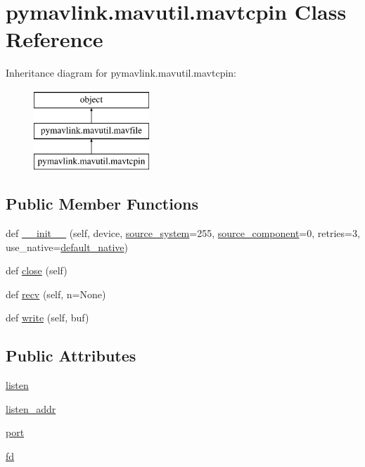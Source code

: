 \hypertarget{classpymavlink_1_1mavutil_1_1mavtcpin}{}\section{pymavlink.\+mavutil.\+mavtcpin Class Reference}
\label{classpymavlink_1_1mavutil_1_1mavtcpin}
Inheritance diagram for pymavlink.\+mavutil.\+mavtcpin\+:\begin{figure}[H]
\begin{center}
\leavevmode
\includegraphics[height=3.000000cm]{classpymavlink_1_1mavutil_1_1mavtcpin}
\end{center}
\end{figure}
\subsection*{Public Member Functions}
\begin{DoxyCompactItemize}
\item 
def \mbox{\hyperlink{classpymavlink_1_1mavutil_1_1mavtcpin_a9fefff3e5fa24dd0ee667699c6a67b57}{\+\_\+\+\_\+init\+\_\+\+\_\+}} (self, device, \mbox{\hyperlink{classpymavlink_1_1mavutil_1_1mavfile_a02c06667c79f4414ed9c4ee6a8dec903}{source\+\_\+system}}=255, \mbox{\hyperlink{classpymavlink_1_1mavutil_1_1mavfile_a84e307f771a9ac2aed567831845c417e}{source\+\_\+component}}=0, retries=3, use\+\_\+native=\mbox{\hyperlink{namespacepymavlink_1_1mavutil_a21ce9da7b698a7bc21c44b9f77341b62}{default\+\_\+native}})
\item 
def \mbox{\hyperlink{classpymavlink_1_1mavutil_1_1mavtcpin_a729201fdb2c0c2f864f742c88879eeec}{close}} (self)
\item 
def \mbox{\hyperlink{classpymavlink_1_1mavutil_1_1mavtcpin_a51df915724f2169ba96fd97fc0897151}{recv}} (self, n=None)
\item 
def \mbox{\hyperlink{classpymavlink_1_1mavutil_1_1mavtcpin_afa11c00945123d40e77e47015066670d}{write}} (self, buf)
\end{DoxyCompactItemize}
\subsection*{Public Attributes}
\begin{DoxyCompactItemize}
\item 
\mbox{\hyperlink{classpymavlink_1_1mavutil_1_1mavtcpin_af5b9dcb071c37a29afd980fb2c789d12}{listen}}
\item 
\mbox{\hyperlink{classpymavlink_1_1mavutil_1_1mavtcpin_ab4726449bada09c361de417e1fc815af}{listen\+\_\+addr}}
\item 
\mbox{\hyperlink{classpymavlink_1_1mavutil_1_1mavtcpin_a8586f3238dd3f55049b9802821c9ee10}{port}}
\item 
\mbox{\hyperlink{classpymavlink_1_1mavutil_1_1mavtcpin_a6789551b18ad3117274da632d46b4b20}{fd}}
\end{DoxyCompactItemize}



